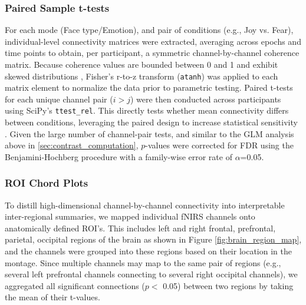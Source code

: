 \subsubsection{Paired Sample t-tests}
For each mode (Face type/Emotion), and pair of conditions (e.g., Joy vs. Fear), individual-level connectivity matrices were extracted, averaging across epochs and time points to obtain, per participant, a symmetric channel-by-channel coherence matrix. 
Because coherence values are bounded between 0 and 1 and exhibit skewed distributions \citep{miranda_de_sa_coherence_2009}, Fisher's r-to-z transform (\texttt{atanh}) was applied to each matrix element to normalize the data prior to parametric testing. 
Paired t-tests for each unique channel pair ($i > j$) were then conducted across participants using SciPy's \texttt{ttest\_rel}.
This directly tests whether mean connectivity differs between conditions, leveraging the paired design to increase statistical sensitivity \citep{hu_characterizing_2023}. 
Given the large number of channel-pair tests, and similar to the GLM analysis above in \ref{sec:contrast_computation}, $p$-values were corrected for FDR using the Benjamini-Hochberg procedure \citep{singh_exploring_2006} with a family-wise error rate of $\alpha$=0.05.

\subsubsection{ROI Chord Plots}
To distill high-dimensional channel-by-channel connectivity into interpretable inter-regional summaries, we mapped individual fNIRS channels onto anatomically defined ROI's. 
This includes left and right frontal, prefrontal, parietal, occipital regions of the brain as shown in Figure \ref{fig:brain_region_map}, and the channels were grouped into these regions based on their location in the montage.
Since multiple channels may map to the same pair of regions (e.g., several left prefrontal channels connecting to several right occipital channels), we aggregated all significant connections ($p <$ 0.05) between two regions by taking the mean of their t-values. 

